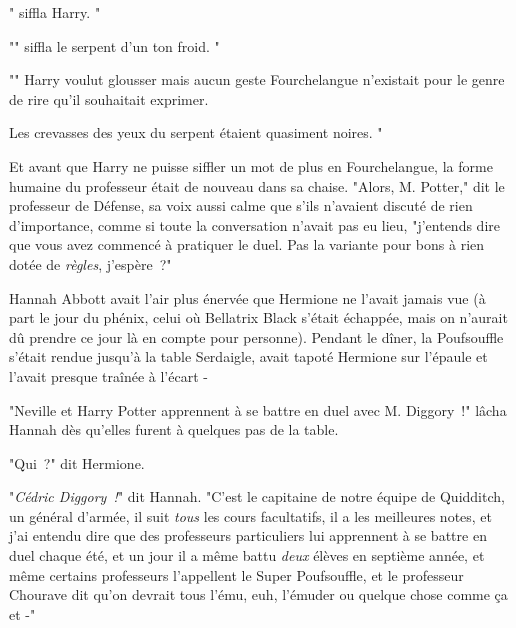" siffla Harry. "

"" siffla le serpent d'un ton froid. "

"" Harry voulut glousser mais aucun geste Fourchelangue n'existait pour le genre de rire qu'il souhaitait exprimer.

Les crevasses des yeux du serpent étaient quasiment noires. "

Et avant que Harry ne puisse siffler un mot de plus en Fourchelangue, la forme humaine du professeur était de nouveau dans sa chaise. "Alors, M. Potter," dit le professeur de Défense, sa voix aussi calme que s'ils n'avaient discuté de rien d'importance, comme si toute la conversation n'avait pas eu lieu, "j'entends dire que vous avez commencé à pratiquer le duel. Pas la variante pour bons à rien dotée de \emph{règles}, j'espère~?"

\later

Hannah Abbott avait l'air plus énervée que Hermione ne l'avait jamais vue (à part le jour du phénix, celui où Bellatrix Black s'était échappée, mais on n'aurait dû prendre ce jour là en compte pour personne). Pendant le dîner, la Poufsouffle s'était rendue jusqu'à la table Serdaigle, avait tapoté Hermione sur l'épaule et l'avait presque traînée à l'écart -

"Neville et Harry Potter apprennent à se battre en duel avec M. Diggory~!" lâcha Hannah dès qu'elles furent à quelques pas de la table.

"Qui~?" dit Hermione.

"\emph{Cédric Diggory~!}" dit Hannah. "C'est le capitaine de notre équipe de Quidditch, un général d'armée, il suit \emph{tous} les cours facultatifs, il a les meilleures notes, et j'ai entendu dire que des professeurs particuliers lui apprennent à se battre en duel chaque été, et un jour il a même battu \emph{deux} élèves en septième année, et même certains professeurs l'appellent le Super Poufsouffle, et le professeur Chourave dit qu'on devrait tous l'ému, euh, l'émuder ou quelque chose comme ça et -"

